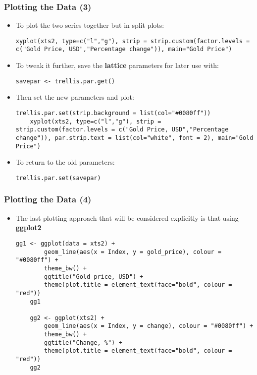 \documentclass[10pt]{beamer}
\theoremstyle{definition}
\begin{document}
\begin{frame}[fragile]
\frametitle{Plotting the Data (3)}
\begin{itemize}
	\item To plot the two series together but in split plots:
	\begin{lstlisting}[style = rstyle, breaklines]
	xyplot(xts2, type=c("l","g"), strip = strip.custom(factor.levels = c("Gold Price, USD","Percentage change")), main="Gold Price")
	\end{lstlisting}
	\item To tweak it further, save the \textbf{lattice} parameters for later use with:
	\begin{lstlisting}[style = rstyle, breaklines]
	savepar <- trellis.par.get()
	\end{lstlisting}
	\item Then set the new parameters and plot:
	\begin{lstlisting}[style = rstyle, breaklines]
	trellis.par.set(strip.background = list(col="#0080ff"))
	xyplot(xts2, type=c("l","g"), strip = strip.custom(factor.levels = c("Gold Price, USD","Percentage change")), par.strip.text = list(col="white", font = 2), main="Gold Price")
	\end{lstlisting}
	\item To return to the old parameters:
	\begin{lstlisting}[style = rstyle, breaklines]
	trellis.par.set(savepar)
	\end{lstlisting}
\end{itemize}
\end{frame}

\begin{frame}[fragile]
\frametitle{Plotting the Data (4)}
\begin{itemize}
	\item The last plotting approach that will be considered explicitly is that using \textbf{ggplot2}
	\begin{lstlisting}[style = rstyle, breaklines]
	gg1 <- ggplot(data = xts2) + 
		geom_line(aes(x = Index, y = gold_price), colour = "#0080ff") + 
		theme_bw() +
		ggtitle("Gold price, USD") + 
		theme(plot.title = element_text(face="bold", colour = "red"))
	gg1

	gg2 <- ggplot(xts2) +
		geom_line(aes(x = Index, y = change), colour = "#0080ff") + 
		theme_bw() +
		ggtitle("Change, %") + 
		theme(plot.title = element_text(face="bold", colour = "red"))
	gg2
	\end{lstlisting}
\end{itemize}
\end{frame}
\end{document}
